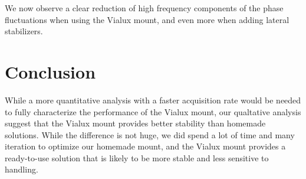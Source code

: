\documentclass[11pt,a4paper]{article}
\begin{document}
We now observe a clear reduction of high frequency components of the phase
fluctuations when using the
Vialux mount, and even more when adding lateral stabilizers.

\section{Conclusion}
While a more quantitative analysis with a faster acquisition rate would be
needed to fully characterize the performance of the Vialux mount, our qualtative
analysis suggest that the Vialux mount provides better stability than homemade
solutions. While the difference is not huge, we did spend a lot of time and many
iteration to optimize our homemade mount, and the Vialux mount provides a
ready-to-use solution that is likely to be more stable and less sensitive to
handling.
\end{document}
